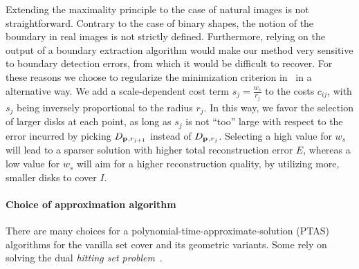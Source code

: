 \documentclass[10pt,twocolumn,letterpaper]{article}
\begin{document}
Extending the maximality principle to the case of natural images is not straightforward.
Contrary to the case of binary shapes, the notion of the boundary in real images is not strictly defined.
Furthermore, relying on the output of a boundary extraction algorithm would make our method very sensitive
to boundary detection errors, from which it would be difficult to recover.
For these reasons we choose to regularize the minimization criterion in~ in a alternative way. 
We add a scale-dependent cost term $s_j = \frac{w_s}{r_j}$ to the costs $c_{ij}$, with $s_j$ 
being inversely proportional to the radius $r_j$.
In this way, we favor the selection of larger disks at each point, as long as $s_j$ is not ``too'' large
with respect to the error incurred by picking $D_{\mathbf{p}_{},r_{j+1}}$ instead of $D_{\mathbf{p}_{},r_j}$.
Selecting a high value for $w_s$ will lead to a sparser solution with higher total reconstruction error $E$,
whereas a low value for $w_s$ will aim for a higher reconstruction quality, by utilizing more, smaller disks
to cover $I$.

\paragraph{Choice of approximation algorithm}
There are many choices for a polynomial-time-approximate-solution (PTAS) algorithms for the vanilla set cover
and its geometric variants.
Some rely on solving the dual \emph{hitting set problem}~\cite{bronnimann1995almost}.
\end{document}

